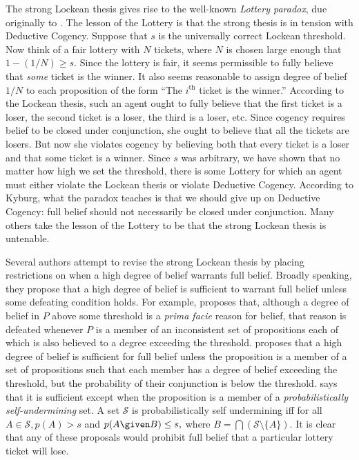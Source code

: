 The strong Lockean thesis gives rise to the well-known {\em Lottery paradox},
due originally to \citet{kyburg1961probability, kyburg1997rule}. The lesson of
the Lottery is that the strong thesis is in tension with Deductive Cogency.
Suppose that $s$ is the universally correct Lockean threshold. Now think of a
fair lottery with $N$ tickets, where $N$ is chosen large enough that $1-(1/N)
\geq s.$ Since the lottery is fair, it seems permissible to fully believe that
{\em some} ticket is the winner. It also seems reasonable to assign degree of
belief $1/N$ to each proposition of the form ``The $i^{\text{th}}$ ticket is the
winner.'' According to the Lockean thesis, such an agent ought to fully believe
that the first ticket is a loser, the second ticket is a loser, the third is a
loser, etc. Since cogency requires belief to be closed under conjunction, she
ought to believe that all the tickets are losers. But now she violates cogency
by believing both that every ticket is a loser and that some ticket is a winner.
Since $s$ was arbitrary, we have shown that no matter how high we set the
threshold, there is some Lottery for which an agent must either violate the
Lockean thesis or violate Deductive Cogency. According to Kyburg, what the
paradox teaches is that we should give up on Deductive Cogency: full belief
should not necessarily be closed under conjunction. Many others take the lesson
of the Lottery to be that the strong Lockean thesis is untenable.

Several authors attempt to revise the strong Lockean thesis by placing
restrictions on when a high degree of belief warrants full belief. Broadly
speaking, they propose that a high degree of belief is sufficient to warrant
full belief unless some defeating condition holds. For example,
\citet{pollock1995cognitive} proposes that, although a degree of belief in $P$
above some threshold is a {\em prima facie} reason for belief, that reason is
defeated whenever $P$ is a member of an inconsistent set of propositions each of
which is also believed to a degree exceeding the threshold.
\citet{ryan1996virtues} proposes that a high degree of belief is sufficient for
full belief unless the proposition is a member of a set of propositions such
that each member has a degree of belief exceeding the threshold, but the
probability of their conjunction is below the threshold.
\citet{douven2002newsolution} says that it is sufficient except when the
proposition is a member of a {\em probabilistically self-undermining} set. A set
$\mathcal{S}$ is probabilistically self undermining iff for all $A \in
\mathcal{S}, p(A)>s$ and $p(A  \given  B)\leq s,$ where $B=\bigcap( \mathcal{S}
\setminus \{ A \}).$ It is clear that any of these proposals would prohibit full
belief that a particular lottery ticket will lose.


